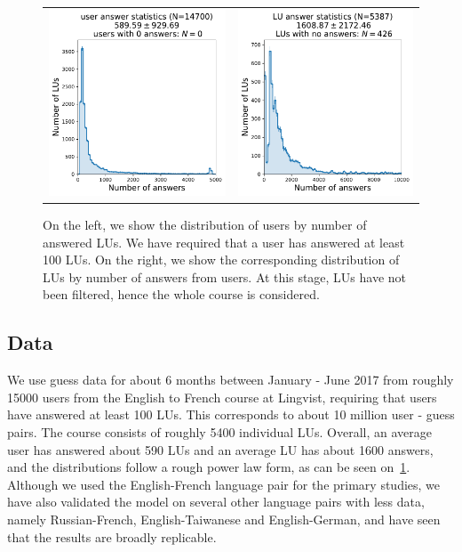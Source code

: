 \begin{figure}[ht]
\centering
\begin{tabular}{cc}
\includegraphics[width=0.5\linewidth]{figures/lingvist/user_answer_distribution.pdf} &
\includegraphics[width=0.5\linewidth]{figures/lingvist/lu_answer_distribution.pdf} \\
\end{tabular}
\caption[Distributions of guesses by LU and user]{On the left, we show the distribution of users by number of answered LUs. We have required that a user has answered at least 100 LUs. On the right, we show the corresponding distribution of LUs by number of answers from users. At this stage, LUs have not been filtered, hence the whole course is considered.} 
\label{fig:user_lu_distribution} 
\end{figure} 

\subsection{Data}
We use guess data for about 6 months between January - June 2017 from roughly 15000 users from the English to French course at Lingvist, requiring that users have answered at least 100 LUs. This corresponds to about 10 million user - guess pairs. The course consists of roughly 5400 individual LUs. Overall, an average user has answered about 590 LUs and an average LU has about 1600 answers, and the distributions follow a rough power law form, as can be seen on~\cref{fig:user_lu_distribution}. Although we used the English-French language pair for the primary studies, we have also validated the model on several other language pairs with less data, namely Russian-French, English-Taiwanese and English-German, and have seen that the results are broadly replicable.

